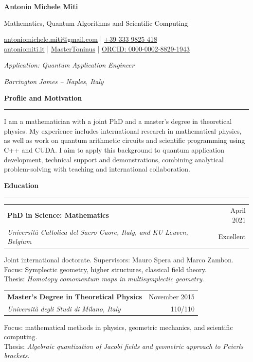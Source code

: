 \documentclass[10pt,a4paper]{article}
\makeatletter
\newcommand{\cvsection}[1]{%
    \Needspace{4\baselineskip}%
    \vspace{0.8em}%
    {\large\bfseries\color{accent} #1}\par
    \vspace{0.2em}\hrule\vspace{0.45em}%
}
\newcommand{\education}[5]{%
    \Needspace{5\baselineskip}%
    \begin{tabularx}{\textwidth}{@{}>{\raggedright\arraybackslash}Xr@{}}
        \textbf{#1} & #2 \\
        \textit{#4} & #3
    \end{tabularx}\par
    #5\par\vspace{0.45em}%
}
\makeatother
\begin{document}
    {\Huge\bfseries Antonio Michele Miti}\par
    \vspace{0.25em}
    {\large\color{accent} Mathematics, Quantum Algorithms and Scientific Computing}\par
    \vspace{0.1em}
    \begin{center}
        \href{mailto:antoniomichele.miti@gmail.com}{%
                \faEnvelope\enspace antoniomichele.miti@gmail.com}  |
        \href{tel:+393339825418}{\faPhone\enspace +39 333 9825 418} \\[3pt]
        \href{https://www.antoniomiti.it/}{\faGlobe\enspace antoniomiti.it} |
        \href{https://github.com/MasterToninus}{\faGithub\enspace MasterToninus} |
        \href{https://orcid.org/0000-0002-8829-1943}{%
            \faOrcid\enspace ORCID: 0000-0002-8829-1943}
    \end{center}
    \vspace{0.1em}
    \textit{Application: Quantum Application Engineer}\par
    \textit{Barrington James -- Naples, Italy}

    \cvsection{Profile and Motivation}

    I am a mathematician with a joint PhD and a master's degree in theoretical physics.
My experience includes international research in mathematical physics, as well as work on
quantum arithmetic circuits and scientific programming using C++ and CUDA.
I aim to apply this background to quantum application development, technical support and
demonstrations, combining analytical problem-solving with teaching and international collaboration.

    \cvsection{Education}

    \education{PhD in Science: Mathematics}{April 2021}{Excellent}
        {Universit\`a Cattolica del Sacro Cuore, Italy, and KU Leuven, Belgium}
        {Joint international doctorate. Supervisors: Mauro Spera and Marco Zambon.
        \\Focus: Symplectic geometry, higher structures, classical field theory.
        \\Thesis: \emph{Homotopy comomentum maps
        in multisymplectic geometry}. }

    \education{Master's Degree in Theoretical Physics}{November 2015}{110/110}
        {Universit\`a degli Studi di Milano, Italy}
        {Focus: mathematical methods in physics, geometric mechanics, and scientific computing.
        \\
        Thesis: \emph{Algebraic quantization of Jacobi fields and geometric
        approach to Peierls brackets}.}
\end{document}
